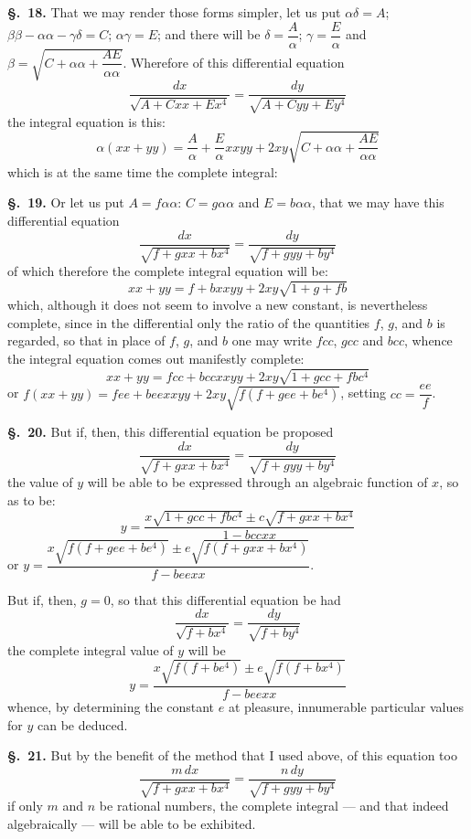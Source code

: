\documentclass{article}
\begin{document}
\textbf{§.~18.} That we may render those forms simpler, let us put $\alpha\delta = A$;
$\beta\beta - \alpha\alpha - \gamma\delta = C$; $\alpha\gamma = E$; and there will be $\delta = \dfrac{A}{\alpha}$;
$\gamma = \dfrac{E}{\alpha}$ and $\beta = \sqrt{C + \alpha\alpha + \dfrac{AE}{\alpha\alpha}}$. Wherefore of this
differential equation
\[ \frac{dx}{\sqrt{A + Cxx + Ex^{4}}} = \frac{dy}{\sqrt{A + Cyy + Ey^{4}}} \tag{6} \]
the integral equation is this:
\[ \alpha(xx + yy) = \frac{A}{\alpha} + \frac{E}{\alpha}xxyy + 2xy\sqrt{C + \alpha\alpha + \frac{AE}{\alpha\alpha}} \tag{7} \]
which is at the same time the complete integral:

\textbf{§.~19.} Or let us put $A = f\alpha\alpha$: $C = g\alpha\alpha$ and $E = b\alpha\alpha$, that we
may have this differential equation
\[ \frac{dx}{\sqrt{f + gxx + bx^{4}}} = \frac{dy}{\sqrt{f + gyy + by^{4}}} \]
of which therefore the complete integral equation will be:
\[ xx + yy = f + bxxyy + 2xy\sqrt{1 + g + fb} \]
which, although it does not seem to involve a new constant, is nevertheless complete, since in the
differential only the ratio of the quantities $f$, $g$, and $b$ is regarded, so that in place of
$f$, $g$, and $b$ one may write $fcc$,
$gcc$ and $bcc$, whence the integral equation comes out manifestly complete:
\[ xx + yy = fcc + bccxxyy + 2xy\sqrt{1 + gcc + fbc^{4}} \]
or $f(xx + yy) = fee + beexxyy + 2xy\sqrt{f(f + gee + be^{4})}$, setting $cc = \dfrac{ee}{f}$.

\textbf{§.~20.} But if, then, this differential equation be proposed
\[ \frac{dx}{\sqrt{f + gxx + bx^{4}}} = \frac{dy}{\sqrt{f + gyy + by^{4}}} \]
the value of $y$ will be able to be expressed through an algebraic function of $x$, so as to be:
\[ y = \frac{x\sqrt{1 + gcc + fbc^{4}} \pm c\sqrt{f + gxx + bx^{4}}}{1 - bccxx} \]
or $y = \dfrac{x\sqrt{f(f + gee + be^{4})} \pm e\sqrt{f(f + gxx + bx^{4})}}{f - beexx}$.

But if, then, $g = 0$, so that this differential equation be had
\[ \frac{dx}{\sqrt{f + bx^{4}}} = \frac{dy}{\sqrt{f + by^{4}}} \]
the complete integral value of $y$ will be
\[ y = \frac{x\sqrt{f(f + be^{4})} \pm e\sqrt{f(f + bx^{4})}}{f - beexx} \]
whence, by determining the constant $e$ at pleasure, innumerable particular values for $y$ can be
deduced.

\textbf{§.~21.} But by the benefit of the method that I used above, of this equation too
\[ \frac{m\,dx}{\sqrt{f + gxx + bx^{4}}} = \frac{n\,dy}{\sqrt{f + gyy + by^{4}}} \]
if only $m$ and $n$ be rational numbers, the complete integral — and that indeed algebraically —
will be able to be exhibited.
\end{document}
